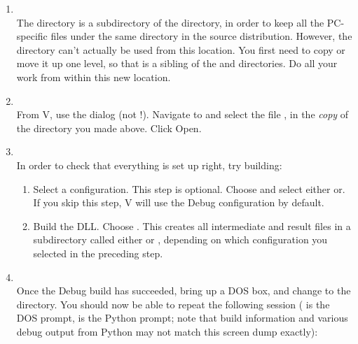 \begin{enumerate}
  \item
  \\
    The  directory is a subdirectory of the 
    directory, in order to keep all the PC-specific files under the
    same directory in the source distribution.  However, the
     directory can't actually be used from this
    location.  You first need to copy or move it up one level, so that
     is a sibling of the  and 
    directories.  Do all your work from within this new location.

  \item
  \\
    From V\Cpp, use the 
    dialog (not !).  Navigate to and
    select the file , in the \emph{copy} of the
     directory you made above.  Click Open.

  \item
  \\
    In order to check that everything is set up right, try building:

    \begin{enumerate}
      \item
        Select a configuration.  This step is optional.  Choose
         and select either  
        or.  If you skip this step,
        V\Cpp{} will use the Debug configuration by default.

      \item
        Build the DLL.  Choose .  This creates all intermediate and result files in
        a subdirectory called either  or ,
        depending on which configuration you selected in the preceding
        step.
    \end{enumerate}

  \item
  \\
    Once the Debug build has succeeded, bring up a DOS box, and change
    to the  directory.  You
    should now be able to repeat the following session ( is
    the DOS prompt, \code{>\code{>}>} is the Python prompt; note that
    build information and various debug output from Python may not
    match this screen dump exactly):


\end{enumerate}
